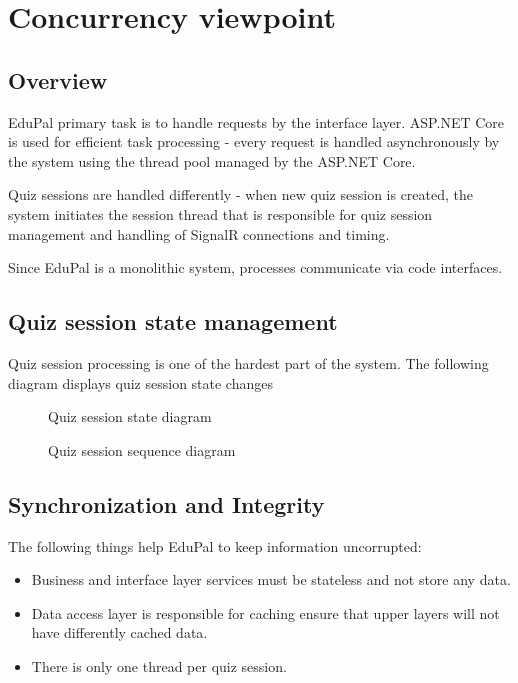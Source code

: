 \section{Concurrency viewpoint}

\subsection{Overview}

EduPal primary task is to handle requests by the interface layer. ASP.NET Core is used for efficient task processing - every request is handled asynchronously by the system using the thread pool managed by the ASP.NET Core.

Quiz sessions are handled differently - when new quiz session is created, the system initiates the session thread that is responsible for quiz session management and handling of SignalR connections and timing.

Since EduPal is a monolithic system, processes communicate via code interfaces.

\subsection{Quiz session state management}

Quiz session processing is one of the hardest part of the system. The following diagram displays quiz session state changes

\begin{figure}[H]
  \caption{Quiz session state diagram}
  \label{fig:concurrency-viewpoint-quiz-session-state}
\end{figure}

\begin{figure}[H]
  \caption{Quiz session sequence diagram}
  \label{fig:concurrency-viewpoint-quiz-conc}
\end{figure}

\subsection{Synchronization and Integrity}

The following things help EduPal to keep information uncorrupted:

\begin{itemize}
  \item Business and interface layer services must be stateless and not store any data.
  \item Data access layer is responsible for caching ensure that upper layers will not have differently cached data.
  \item There is only one thread per quiz session.
\end{itemize}

